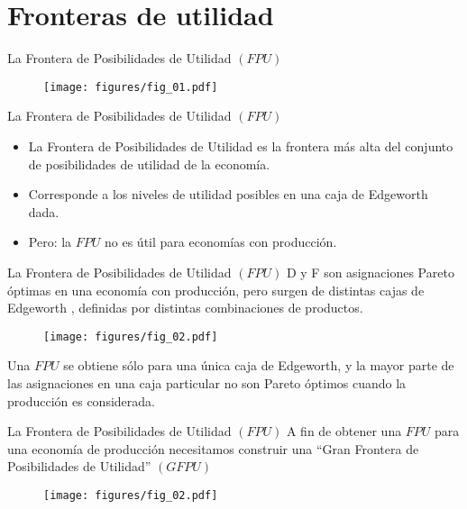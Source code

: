 \section{Fronteras de utilidad}

\begin{frame}{La Frontera de Posibilidades de Utilidad $(FPU)$}
	\begin{figure}[h]
		\centering
		 \texttt{[image: figures/fig\_01.pdf]}
	\end{figure}
\end{frame}
\begin{frame}{La Frontera de Posibilidades de Utilidad $(FPU)$}
	\begin{itemize}
		\item La Frontera de Posibilidades de Utilidad es la frontera más alta del conjunto de posibilidades de utilidad de la economía.
		\item Corresponde a los niveles de utilidad posibles en una caja de Edgeworth dada.
		\item Pero: la $FPU$ no es útil para economías con producción.
	\end{itemize}
\end{frame}
\begin{frame}{La Frontera de Posibilidades de Utilidad $(FPU)$}
D y F son asignaciones Pareto óptimas en una economía con producción, pero surgen de distintas cajas de Edgeworth , definidas por distintas combinaciones de productos.
	\begin{figure}[h]
		\centering
		\texttt{[image: figures/fig\_02.pdf]}
	\end{figure}
Una $FPU$ se obtiene sólo para una única caja de Edgeworth, y la mayor parte de las asignaciones en una caja particular no son Pareto óptimos cuando la producción es considerada.
\end{frame}
\begin{frame}{La Frontera de Posibilidades de Utilidad $(FPU)$}
A fin de obtener una $FPU$ para una economía de producción necesitamos construir una ``Gran Frontera de Posibilidades de Utilidad'' $(GFPU)$
	\begin{figure}[h]
		\centering
		\texttt{[image: figures/fig\_02.pdf]}
	\end{figure}
\end{frame}
